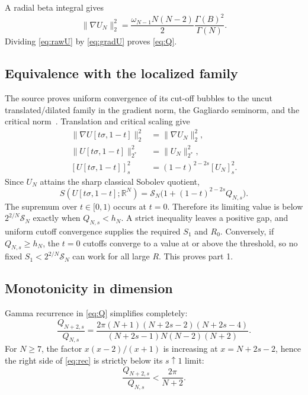 \documentclass[11pt]{article}
\newcommand{\R}{\mathbb{R}}
\newcommand{\SN}{\mathcal{S}_N}
\begin{document}
A radial beta integral gives
\begin{equation}
 \|\nabla U_N\|_2^2
 =\frac{\omega_{N-1}N(N-2)}{2}
 \frac{\Gamma(B)^2}{\Gamma(N)}.                        \label{eq:gradU}
\end{equation}
Dividing \eqref{eq:rawU} by \eqref{eq:gradU} proves
\eqref{eq:Q}.

\subsection{Equivalence with the localized family}

The source proves uniform convergence of its cut-off bubbles to the uncut
translated/dilated family in the gradient norm, the Gagliardo seminorm, and
the critical norm~\cite[Section 4]{source}. Translation and critical scaling
give
\begin{align*}
 \|\nabla U[t\sigma,1-t]\|_2^2&=\|\nabla U_N\|_2^2,\\
 \|U[t\sigma,1-t]\|_{2^*}^2&=\|U_N\|_{2^*}^2,\\
 [U[t\sigma,1-t]]_s^2&=(1-t)^{2-2s}[U_N]_s^2.
\end{align*}
Since $U_N$ attains the sharp classical Sobolev quotient,
\[
 S(U[t\sigma,1-t];\R^N)
 =\SN\bigl(1+(1-t)^{2-2s}Q_{N,s}\bigr).
\]
The supremum over $t\in[0,1)$ occurs at $t=0$. Therefore its limiting value
is below $2^{2/N}\SN$ exactly when $Q_{N,s}<h_N$. A strict inequality leaves a
positive gap, and uniform cutoff convergence supplies the required $S_1$ and
$R_0$. Conversely, if $Q_{N,s}\geq h_N$, the $t=0$ cutoffs converge to a value
at or above the threshold, so no fixed $S_1<2^{2/N}\SN$ can work for all large
$R$. This proves part 1.

\subsection{Monotonicity in dimension}

Gamma recurrence in \eqref{eq:Q} simplifies completely:
\begin{equation}
 \frac{Q_{N+2,s}}{Q_{N,s}}
 =\frac{2\pi(N+1)(N+2s-2)(N+2s-4)}
 {(N+2s-1)N(N-2)(N+2)}.                                \label{eq:rec}
\end{equation}
For $N\geq7$, the factor
$x(x-2)/(x+1)$ is increasing at $x=N+2s-2$, hence the right side of
\eqref{eq:rec} is strictly below its $s\uparrow1$ limit:
\begin{equation}
 \frac{Q_{N+2,s}}{Q_{N,s}}<\frac{2\pi}{N+2}.           \label{eq:qbound}
\end{equation}
\end{document}
